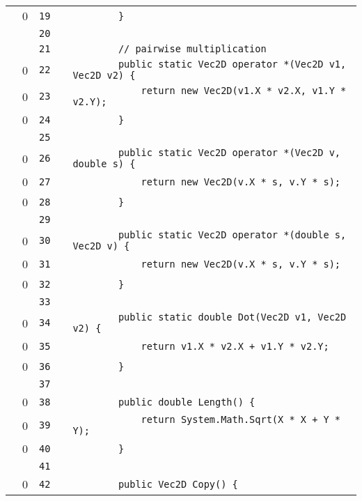 \documentclass[a4paper,landscape,10pt]{article}
\begin{document}
\begin{longtable}[l]{lrrll}
\cellcolor{red} & 0 & \verb~19~ & & \verb~        }~\\
\cellcolor{gray} &  & \verb~20~ & & \verb~~\\
\cellcolor{gray} &  & \verb~21~ & & \verb~        // pairwise multiplication~\\
\cellcolor{red} & 0 & \verb~22~ & & \verb~        public static Vec2D operator *(Vec2D v1, Vec2D v2) {~\\
\cellcolor{red} & 0 & \verb~23~ & & \verb~            return new Vec2D(v1.X * v2.X, v1.Y * v2.Y);~\\
\cellcolor{red} & 0 & \verb~24~ & & \verb~        }~\\
\cellcolor{gray} &  & \verb~25~ & & \verb~~\\
\cellcolor{red} & 0 & \verb~26~ & & \verb~        public static Vec2D operator *(Vec2D v, double s) {~\\
\cellcolor{red} & 0 & \verb~27~ & & \verb~            return new Vec2D(v.X * s, v.Y * s);~\\
\cellcolor{red} & 0 & \verb~28~ & & \verb~        }~\\
\cellcolor{gray} &  & \verb~29~ & & \verb~~\\
\cellcolor{red} & 0 & \verb~30~ & & \verb~        public static Vec2D operator *(double s, Vec2D v) {~\\
\cellcolor{red} & 0 & \verb~31~ & & \verb~            return new Vec2D(v.X * s, v.Y * s);~\\
\cellcolor{red} & 0 & \verb~32~ & & \verb~        }~\\
\cellcolor{gray} &  & \verb~33~ & & \verb~~\\
\cellcolor{red} & 0 & \verb~34~ & & \verb~        public static double Dot(Vec2D v1, Vec2D v2) {~\\
\cellcolor{red} & 0 & \verb~35~ & & \verb~            return v1.X * v2.X + v1.Y * v2.Y;~\\
\cellcolor{red} & 0 & \verb~36~ & & \verb~        }~\\
\cellcolor{gray} &  & \verb~37~ & & \verb~~\\
\cellcolor{red} & 0 & \verb~38~ & & \verb~        public double Length() {~\\
\cellcolor{red} & 0 & \verb~39~ & & \verb~            return System.Math.Sqrt(X * X + Y * Y);~\\
\cellcolor{red} & 0 & \verb~40~ & & \verb~        }~\\
\cellcolor{gray} &  & \verb~41~ & & \verb~~\\
\cellcolor{red} & 0 & \verb~42~ & & \verb~        public Vec2D Copy() {~\\

\end{longtable}
\end{document}
